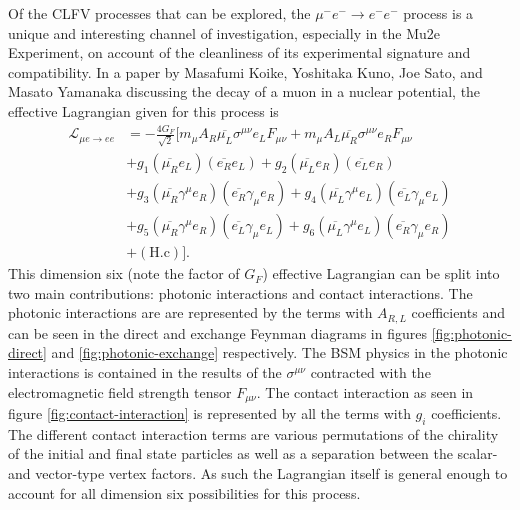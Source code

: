 \documentclass[12pt]{article}
\newcommand{\muEtoEE}{\mu^- e^- \to e^- e^-}
\begin{document}
Of the CLFV processes that can be explored, the $\muEtoEE$ process is a unique and interesting channel of investigation, especially in the Mu2e Experiment, on account of the cleanliness of its experimental signature and compatibility. In a paper by Masafumi Koike, Yoshitaka Kuno, Joe Sato, and Masato Yamanaka \cite{NewProcess2010} discussing the decay of a muon in a nuclear potential, the effective Lagrangian given for this process is 
  \begin{equation}\label{eqn:MuEtoEE_Lagrangian}
        \begin{aligned}
        \mathcal{L}_{\mu e\to ee} &= -\frac{4G_F}{\sqrt{2}}[m_\mu A_R \overline{\mu_L}\sigma^{\mu\nu}e_LF_{\mu\nu}+ m_\mu A_L\overline{\mu_R}\sigma^{\mu\nu}e_RF_{\mu\nu}  \\ 
        &+g_1(\overline{\mu_R}e_L)(\overline{e_R}e_L)+g_2(\overline{\mu_L}e_R)(\overline{e_L}e_R) \\
        &+g_3(\overline{\mu_R}\gamma^\mu e_R)(\overline{e_R}\gamma_\mu e_R)+ g_4(\overline{\mu_L}\gamma^\mu e_L)(\overline{e_L}\gamma_\mu e_L) \\
        &+ g_5(\overline{\mu_R}\gamma^\mu e_R)(\overline{e_L}\gamma_\mu e_L) + g_6(\overline{\mu_L}\gamma^\mu e_L)(\overline{e_R}\gamma_\mu e_R) \\
        &+ (\text{H.c})].
    \end{aligned}
   \end{equation}
This dimension six (note the factor of $G_F$) effective Lagrangian can be split into two main contributions: photonic interactions and contact interactions. The photonic interactions are are represented by the terms with $A_{R,L}$ coefficients and can be seen in the direct and exchange Feynman diagrams in figures \ref{fig:photonic-direct} and \ref{fig:photonic-exchange} respectively. The BSM physics in the photonic interactions is contained in the results of the $\sigma^{\mu\nu}$ contracted with the electromagnetic field strength tensor $F_{\mu\nu}$. The contact interaction as seen in figure \ref{fig:contact-interaction} is represented by all the terms with $g_i$ coefficients. The different contact interaction terms are various permutations of the chirality of the initial and final state particles as well as a separation between the scalar- and vector-type vertex factors. As such the Lagrangian itself is general enough to account for all dimension six possibilities for this process.
\end{document}
